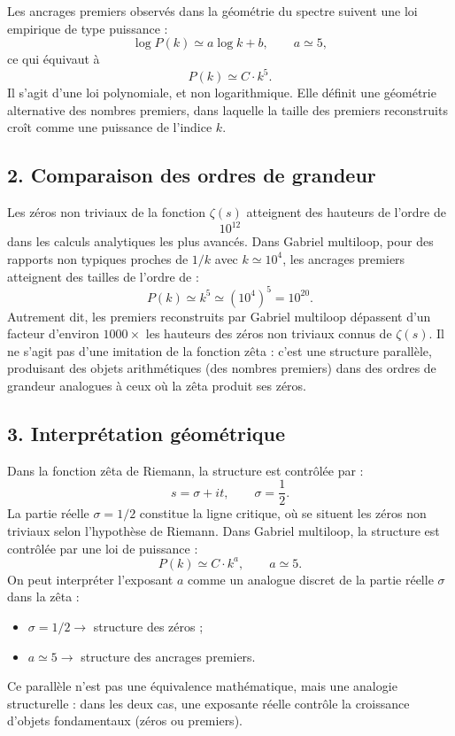\documentclass[11pt,a4paper]{article}
\begin{document}
Les ancrages premiers observés dans la géométrie du spectre suivent une loi empirique
de type puissance :
\[
\log P(k)\simeq a\log k+b,\qquad a\simeq 5,
\]
ce qui équivaut à
\[
P(k)\simeq C\cdot k^{5}.
\]
Il s'agit d'une loi polynomiale, et non logarithmique. Elle définit une géométrie
alternative des nombres premiers, dans laquelle la taille des premiers reconstruits
croît comme une puissance de l'indice $k$.

\subsection*{2. Comparaison des ordres de grandeur}

Les zéros non triviaux de la fonction $\zeta(s)$ atteignent des hauteurs de l'ordre de
\[
10^{12}
\]
dans les calculs analytiques les plus avancés. Dans Gabriel multiloop, pour des
rapports non typiques proches de $1/k$ avec $k\simeq 10^{4}$, les ancrages premiers
atteignent des tailles de l'ordre de :
\[
P(k)\simeq k^{5}\simeq\left(10^{4}\right)^{5}=10^{20}.
\]
Autrement dit, les premiers reconstruits par Gabriel multiloop dépassent d'un facteur
d'environ $1000\times$ les hauteurs des zéros non triviaux connus de $\zeta(s)$. Il ne
s'agit pas d'une imitation de la fonction zêta : c'est une structure parallèle,
produisant des objets arithmétiques (des nombres premiers) dans des ordres de
grandeur analogues à ceux où la zêta produit ses zéros.

\subsection*{3. Interprétation géométrique}

Dans la fonction zêta de Riemann, la structure est contrôlée par :
\[
s=\sigma+it,\qquad \sigma=\frac{1}{2}.
\]
La partie réelle $\sigma=1/2$ constitue la ligne critique, où se situent les zéros non
triviaux selon l'hypothèse de Riemann. Dans Gabriel multiloop, la structure est
contrôlée par une loi de puissance :
\[
P(k)\simeq C\cdot k^{a},\qquad a\simeq 5.
\]
On peut interpréter l'exposant $a$ comme un analogue discret de la partie réelle
$\sigma$ dans la zêta :
\begin{itemize}[nosep]
  \item $\sigma=1/2\to$ structure des zéros ;
  \item $a\simeq 5\to$ structure des ancrages premiers.
\end{itemize}
Ce parallèle n'est pas une équivalence mathématique, mais une analogie structurelle :
dans les deux cas, une exposante réelle contrôle la croissance d'objets fondamentaux
(zéros ou premiers).
\end{document}
